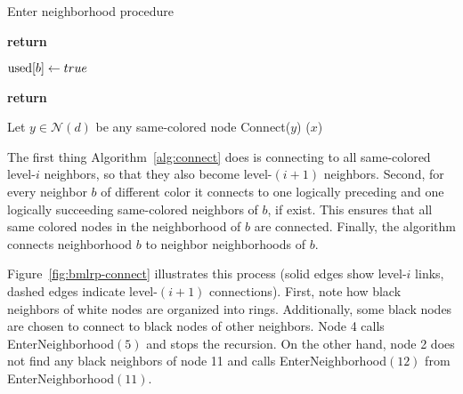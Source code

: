 \documentclass[conference]{IEEEtran}
\theoremstyle{definition}
\newcommand{\cN}{{\mathcal{N}}}
\begin{document}
\begin{algorithm}
  \caption{Enter neighborhood procedure}

    
    \begin{algorithmic}[1]
                \State \textbf{return}      %
            \EndIf
                
            \State ${\rm used}[b] \gets true$

            \If {$d \in \cN(a)$}
                \State \textbf{return}      %
            \EndIf

            \If {$\{x : x \in \cN(d), {\rm color}(x) = {\rm color}(a)\} \ne \emptyset$}
               \State Let $y \in \cN(d)$ be any same-colored node
                \State Connect($y$)
            \Else
                \For {$x \in \cN(d)$}
                    ($x$)
                \EndFor
            \EndIf
        \EndProcedure
    \end{algorithmic}
	\label{alg:enterneighborhood}
\end{algorithm}

The first thing Algorithm~\ref{alg:connect} does is connecting to all same-colored level-$i$ neighbors, so that they also become level-$(i+1)$ neighbors. Second, for every neighbor $b$ of different color it connects to one logically preceding and one logically succeeding same-colored neighbors of $b$, if exist. This ensures that all same colored nodes in the neighborhood of $b$ are connected. Finally, the algorithm connects neighborhood $b$ to neighbor neighborhoods of $b$.

Figure~\ref{fig:bmlrp-connect} illustrates this process (solid edges show level-$i$ links, dashed edges indicate level-$(i+1)$ connections). First, note how black neighbors of white nodes are organized into rings. Additionally, some black nodes are chosen to connect to black nodes of other neighbors. Node 4 calls  EnterNeighborhood$(5)$ and stops the recursion. On the other hand, node 2 does not find any black neighbors of node 11 and calls EnterNeighborhood$(12)$ from EnterNeighborhood$(11)$.


\end{document}
